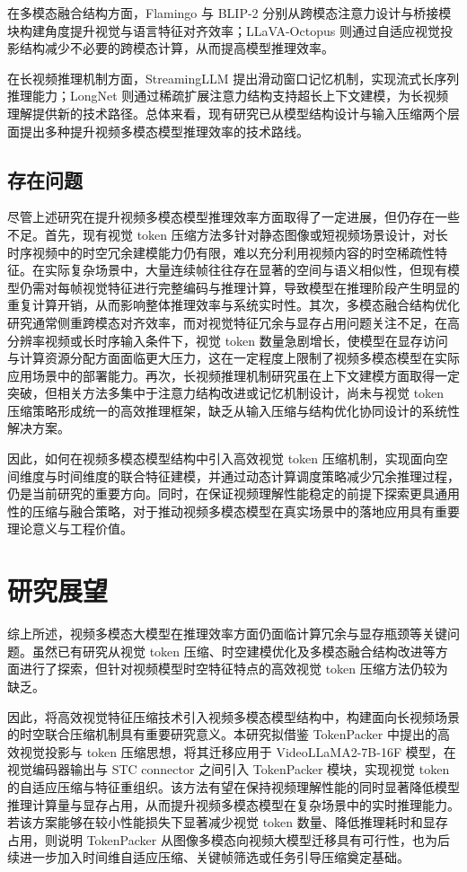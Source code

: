 在多模态融合结构方面，Flamingo 与 BLIP-2 分别从跨模态注意力设计与桥接模块构建角度提升视觉与语言特征对齐效率\cite{flamingo2022,blip22023}；LLaVA-Octopus 则通过自适应视觉投影结构减少不必要的跨模态计算，从而提高模型推理效率\cite{llavaoctopus2025}。

在长视频推理机制方面，StreamingLLM 提出滑动窗口记忆机制，实现流式长序列推理能力\cite{streamingllm2023}；LongNet 则通过稀疏扩展注意力结构支持超长上下文建模，为长视频理解提供新的技术路径\cite{longnet2023}。总体来看，现有研究已从模型结构设计与输入压缩两个层面提出多种提升视频多模态模型推理效率的技术路线。

\subsection{存在问题}

尽管上述研究在提升视频多模态模型推理效率方面取得了一定进展，但仍存在一些不足。首先，现有视觉 token 压缩方法多针对静态图像或短视频场景设计，对长时序视频中的时空冗余建模能力仍有限，难以充分利用视频内容的时空稀疏性特征。在实际复杂场景中，大量连续帧往往存在显著的空间与语义相似性，但现有模型仍需对每帧视觉特征进行完整编码与推理计算，导致模型在推理阶段产生明显的重复计算开销，从而影响整体推理效率与系统实时性。其次，多模态融合结构优化研究通常侧重跨模态对齐效率，而对视觉特征冗余与显存占用问题关注不足，在高分辨率视频或长时序输入条件下，视觉 token 数量急剧增长，使模型在显存访问与计算资源分配方面面临更大压力，这在一定程度上限制了视频多模态模型在实际应用场景中的部署能力。再次，长视频推理机制研究虽在上下文建模方面取得一定突破，但相关方法多集中于注意力结构改进或记忆机制设计，尚未与视觉 token 压缩策略形成统一的高效推理框架，缺乏从输入压缩与结构优化协同设计的系统性解决方案。

因此，如何在视频多模态模型结构中引入高效视觉 token 压缩机制，实现面向空间维度与时间维度的联合特征建模，并通过动态计算调度策略减少冗余推理过程，仍是当前研究的重要方向。同时，在保证视频理解性能稳定的前提下探索更具通用性的压缩与融合策略，对于推动视频多模态模型在真实场景中的落地应用具有重要理论意义与工程价值。

\section{研究展望}

综上所述，视频多模态大模型在推理效率方面仍面临计算冗余与显存瓶颈等关键问题。虽然已有研究从视觉 token 压缩、时空建模优化及多模态融合结构改进等方面进行了探索，但针对视频模型时空特征特点的高效视觉 token 压缩方法仍较为缺乏。

因此，将高效视觉特征压缩技术引入视频多模态模型结构中，构建面向长视频场景的时空联合压缩机制具有重要研究意义。本研究拟借鉴 TokenPacker 中提出的高效视觉投影与 token 压缩思想，将其迁移应用于 VideoLLaMA2-7B-16F 模型，在视觉编码器输出与 STC connector 之间引入 TokenPacker 模块，实现视觉 token 的自适应压缩与特征重组织。该方法有望在保持视频理解性能的同时显著降低模型推理计算量与显存占用，从而提升视频多模态模型在复杂场景中的实时推理能力。若该方案能够在较小性能损失下显著减少视觉 token 数量、降低推理耗时和显存占用，则说明 TokenPacker 从图像多模态向视频大模型迁移具有可行性，也为后续进一步加入时间维自适应压缩、关键帧筛选或任务引导压缩奠定基础。

\newpage
\begingroup
    \printbibliography[title={参考文献}]
\endgroup
